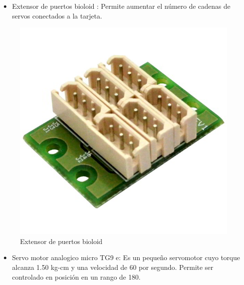 \begin{itemize}
\item Extensor de puertos bioloid : Permite aumentar el número de cadenas de servos conectados a la tarjeta. \cite{hub} 
\end{itemize}

\begin{figure}[hbtp]
\centering
\includegraphics[scale=0.3]{imagenes/Dynamixel-AX-MX-6-Port-Extension-Hub-600x600.jpg}
\caption{Extensor de puertos bioloid}
\end{figure}

\begin{itemize}
\item Servo motor analogico micro TG9 e: Es un pequeño servomotor cuyo torque alcanza 1.50 kg-cm y una velocidad de 60 por
segundo. Permite ser controlado en posición en un rango de 180. \cite{microservo}  

\end{itemize}

